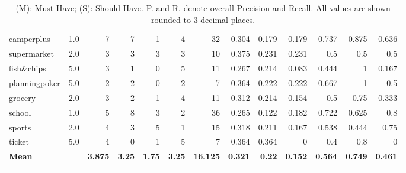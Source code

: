 \documentclass[runningheads]{llncs}
\begin{document}
\begin{table}[H]
{\begin{tabular}{|l|c|r|r|r|r|r|r|r|r|r|r|r|}
     camperplus    & 1.0         & 7              & 7                & 1              & 4                & 32     & 0.304       & 0.179                 & 0.179                   & 0.737    & 0.875              & 0.636                \\\n supermarket   & 2.0         & 3              & 3                & 3              & 3                & 10     & 0.375       & 0.231                 & 0.231                   & 0.5      & 0.5                & 0.5                  \\\n fish\&chips    & 5.0         & 3              & 1                & 0              & 5                & 11     & 0.267       & 0.214                 & 0.083                   & 0.444    & 1                  & 0.167                \\\n planningpoker & 5.0         & 2              & 2                & 0              & 2                & 7      & 0.364       & 0.222                 & 0.222                   & 0.667    & 1                  & 0.5                  \\\n grocery       & 2.0         & 3              & 2                & 1              & 4                & 11     & 0.312       & 0.214                 & 0.154                   & 0.5      & 0.75               & 0.333                \\\n school        & 1.0         & 5              & 8                & 3              & 2                & 36     & 0.265       & 0.122                 & 0.182                   & 0.722    & 0.625              & 0.8                  \\\n sports        & 2.0         & 4              & 3                & 5              & 1                & 15     & 0.318       & 0.211                 & 0.167                   & 0.538    & 0.444              & 0.75                 \\\n ticket        & 5.0         & 4              & 0                & 1              & 5                & 7      & 0.364       & 0.364                 & 0                       & 0.4      & 0.8                & 0                    \\\n \textbf{Mean}          &             & \textbf{3.875}          & \textbf{3.25}             & \textbf{1.75}           & \textbf{3.25}             & \textbf{16.125} & \textbf{0.321}       & \textbf{0.22}                  & \textbf{0.152}                   & \textbf{0.564}    & \textbf{0.749}              & \textbf{0.461}                \\\n\hline 
    \hline
    \end{tabular}
}
\caption*{(M): Must Have; (S): Should Have. P. and R. denote overall Precision and Recall. All values are shown rounded to 3 decimal places.}
\end{table}
\end{document}
